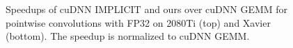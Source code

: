 \begin{table}[]
\begin{threeparttable}
\begin{tabular}{lrrrrrrrrrr }
\bottomrule
\end{tabular}
\end{threeparttable}
\end{table}




\begin{figure}
\captionsetup[subfloat]{labelformat=empty,skip=0pt}
	\centering
\vspace{-5mm}
	\vspace{-6mm}
	\caption{Speedups of cuDNN IMPLICIT and ours over cuDNN GEMM for pointwise convolutions with FP32 on 2080Ti (top) and Xavier (bottom). The speedup is normalized to cuDNN GEMM. }
	\label{fig:pwspeedupfp32}
\end{figure}

